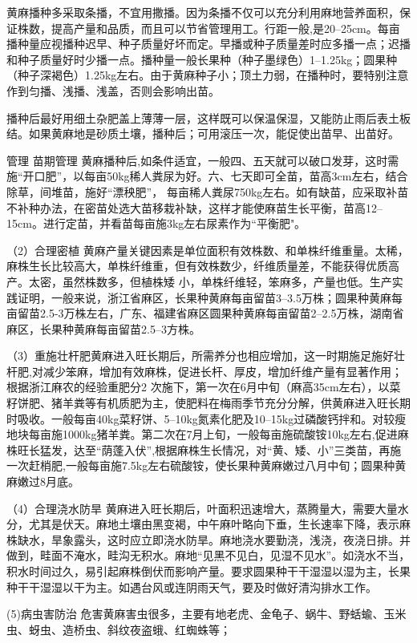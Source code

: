 \documentclass{ctexbook}
\begin{document}
黄麻播种多采取条播，不宜用撒播。因为条播不仅可以充分利用麻地营养面积，保证株数，提高产量和品质，而且可以节省管理用工。行距一般,是20--25cm。每亩播种量应视播种迟早、种子质量好坏而定。早播或种子质量差时应多播一点；迟播和种子质量好时少播一点。播种量一般长果种（种子墨绿色）1--1.25kg；圆果种（种子深褐色）1.25kg左右。由于黄麻种子小；顶土力弱，在播种时，要特别注意作到匀播、浅播、浅盖，否则会影响出苗。

播种后最好用细土杂肥盖上薄薄一层，这样既可以保温保湿，又能防止雨后表土板结。如果黄麻地是砂质土壤，播种后；可用滚压一次，能促使出苗早、出苗好。

管理
苗期管理 黄麻播种后,如条件适宜，一般四、五天就可以破口发芽，这时需施“开口肥”，以每亩50kg稀人粪尿为好。六、七天即可全苗，苗高3cm左右，结合除草，间堆苗，施好“漂秧肥”，
每亩稀人粪尿750kg左右。如有缺苗，应采取补苗不补种办法，在密苗处选大苗移栽补缺，这样才能使麻苗生长平衡，苗高12--15cm。进行定苗，并看苗每亩施3kg左右尿素作为“平衡肥"。

（2）合理密植 黄麻产量关键因素是单位面积有效株数、和单株纤维重量。太稀，麻株生长比较高大，单株纤维重，但有效株数少，纤维质量差，不能获得优质高产。太密，虽然株数多，但植株矮
小，单株纤维轻，笨麻多，产量也低。生产实践证明，一般来说，浙江省麻区，长果种黄麻每亩留苗3--3.5万株；圆果种黄麻每亩留苗2.5-3万株左右，广东、福建省麻区圆果种黄麻每亩留苗2--2.5万株，湖南省麻区，长果种黄麻每亩留苗2.5--3方株。

（3）重施壮杆肥黄麻进入旺长期后，所需养分也相应增加，这一时期施足施好壮杆肥,对减少笨麻，增加有效麻株，促进长杆、厚皮，增加纤维产量有显著作用；根据浙江麻农的经验重肥分2
次施下，第一次在6月中旬（麻高35cm左右），以菜籽饼肥、猪羊粪等有机质肥为主，使肥料在梅雨季节充分分解，供黄麻进入旺长期时吸收。一般每亩40kg菜籽饼、5--10kg氮素化肥及10--15kg过磷酸钙拌和。对较瘦地块每亩施1000kg猪羊粪。第二次在7月上旬，一般每亩施硫酸铵10kg左右,促进麻株旺长猛发，达至“荫蓬入伏”,根据麻株生长情况，对“黄、矮、小”三类苗，再施一次赶梢肥,一般每亩施7.5kg左右硫酸铵，使长果种黄麻嫩过八月中旬；圆果种黄麻嫩过8月底。

（4）合理浇水防旱 黄麻进入旺长期后，叶面积迅速增大，蒸腾量大，需要大量水分，尤其是伏天。麻地土壤由黑变褐，中午麻叶略向下垂，生长速率下降，表示麻株缺水，旱象露头，这时应立即浇水防旱。麻地浇水要勤浇，浅浇，夜浇日排。并做到，畦面不淹水，畦沟无积水。麻地“见黑不见白，见湿不见水”。如浇水不当，积水时间过久，易引起麻株倒伏而影响产量。要求圆果种干干湿湿以湿为主，长果种干干湿湿以干为主。如遇台风或连阴雨天气，要及时做好清沟排水工作。

(5)病虫害防治 危害黄麻害虫很多，主要有地老虎、金龟子、蜗牛、野蛞蝓、玉米虫、蚜虫、造桥虫、斜纹夜盗蛾、红蜘蛛等；
\end{document}
